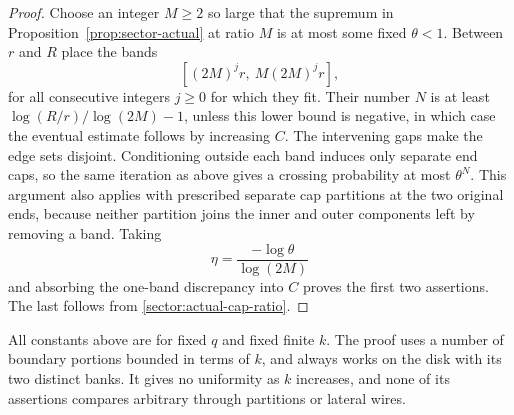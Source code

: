 \begin{proof}
Choose an integer $M\ge2$ so large that the supremum in
Proposition~\ref{prop:sector-actual} at ratio $M$ is at most some
fixed $\theta<1$.  Between $r$ and $R$ place the bands
\[
 [(2M)^j r,\ M(2M)^j r],
\]
for all consecutive integers $j\ge0$ for which they fit.  Their
number $N$ is at least
$\log(R/r)/\log(2M)-1$, unless this lower bound is negative, in
which case the eventual estimate follows by increasing $C$.
The intervening gaps make the edge sets disjoint.  Conditioning
outside each band induces only separate end caps, so the same
iteration as above gives a crossing probability at most $\theta^N$.
This argument also applies with prescribed separate cap partitions
at the two original ends, because neither partition joins the
inner and outer components left by removing a band.  Taking
\[
 \eta=\frac{-\log\theta}{\log(2M)}
\]
and absorbing the one-band discrepancy into $C$ proves the first
two assertions.  The last follows from
\eqref{sector:actual-cap-ratio}.
\end{proof}

\begin{remark}
All constants above are for fixed $q$ and fixed finite $k$.  The
proof uses a number of boundary portions bounded in terms of $k$,
and always works on the disk with its two distinct banks.  It gives
no uniformity as $k$ increases, and none of its assertions compares
arbitrary through partitions or lateral wires.
\end{remark}
